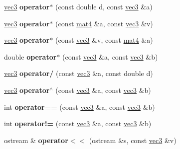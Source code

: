 \begin{DoxyCompactItemize}
\item 
\hypertarget{classvec3_ab03a4917adc5f9dde8cb836d3e52196e}{
\hyperlink{classvec3}{vec3} {\bfseries operator$\ast$} (const double d, const \hyperlink{classvec3}{vec3} \&a)}
\label{classvec3_ab03a4917adc5f9dde8cb836d3e52196e}

\item 
\hypertarget{classvec3_a3a7a7dfc514a58f3c889b48fa4745815}{
\hyperlink{classvec3}{vec3} {\bfseries operator$\ast$} (const \hyperlink{classmat4}{mat4} \&a, const \hyperlink{classvec3}{vec3} \&v)}
\label{classvec3_a3a7a7dfc514a58f3c889b48fa4745815}

\item 
\hypertarget{classvec3_ac87402f559c51cd778b6012774481c39}{
\hyperlink{classvec3}{vec3} {\bfseries operator$\ast$} (const \hyperlink{classvec3}{vec3} \&v, const \hyperlink{classmat4}{mat4} \&a)}
\label{classvec3_ac87402f559c51cd778b6012774481c39}

\item 
\hypertarget{classvec3_a716b420b911bbe142a25cd0f71e2086a}{
double {\bfseries operator$\ast$} (const \hyperlink{classvec3}{vec3} \&a, const \hyperlink{classvec3}{vec3} \&b)}
\label{classvec3_a716b420b911bbe142a25cd0f71e2086a}

\item 
\hypertarget{classvec3_ae9f6ac8e49dfe72ceb17bfa3d8cf3359}{
\hyperlink{classvec3}{vec3} {\bfseries operator/} (const \hyperlink{classvec3}{vec3} \&a, const double d)}
\label{classvec3_ae9f6ac8e49dfe72ceb17bfa3d8cf3359}

\item 
\hypertarget{classvec3_a16406bbc4fe292058a2a72c632bd9f04}{
\hyperlink{classvec3}{vec3} {\bfseries operator$^\wedge$} (const \hyperlink{classvec3}{vec3} \&a, const \hyperlink{classvec3}{vec3} \&b)}
\label{classvec3_a16406bbc4fe292058a2a72c632bd9f04}

\item 
\hypertarget{classvec3_afd81ebd50d23e1a4fb4b424757e96686}{
int {\bfseries operator==} (const \hyperlink{classvec3}{vec3} \&a, const \hyperlink{classvec3}{vec3} \&b)}
\label{classvec3_afd81ebd50d23e1a4fb4b424757e96686}

\item 
\hypertarget{classvec3_a381a6582f6b2009279a581249b5a88cd}{
int {\bfseries operator!=} (const \hyperlink{classvec3}{vec3} \&a, const \hyperlink{classvec3}{vec3} \&b)}
\label{classvec3_a381a6582f6b2009279a581249b5a88cd}

\item 
\hypertarget{classvec3_ad6aaa5ab4fc333c0619e1cf134b1fc53}{
ostream \& {\bfseries operator$<$$<$} (ostream \&s, const \hyperlink{classvec3}{vec3} \&v)}
\label{classvec3_ad6aaa5ab4fc333c0619e1cf134b1fc53}


\end{DoxyCompactItemize}
